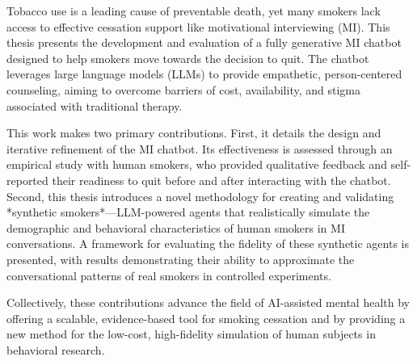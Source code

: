 Tobacco use is a leading cause of preventable death, yet many smokers lack access to effective cessation support like motivational interviewing (MI). This thesis presents the development and evaluation of a fully generative MI chatbot designed to help smokers move towards the decision to quit. The chatbot leverages large language models (LLMs) to provide empathetic, person-centered counseling, aiming to overcome barriers of cost, availability, and stigma associated with traditional therapy.

This work makes two primary contributions. First, it details the design and iterative refinement of the MI chatbot. Its effectiveness is assessed through an empirical study with human smokers, who provided qualitative feedback and self-reported their readiness to quit before and after interacting with the chatbot. Second, this thesis introduces a novel methodology for creating and validating *synthetic smokers*—LLM-powered agents that realistically simulate the demographic and behavioral characteristics of human smokers in MI conversations. A framework for evaluating the fidelity of these synthetic agents is presented, with results demonstrating their ability to approximate the conversational patterns of real smokers in controlled experiments.

Collectively, these contributions advance the field of AI-assisted mental health by offering a scalable, evidence-based tool for smoking cessation and by providing a new method for the low-cost, high-fidelity simulation of human subjects in behavioral research.